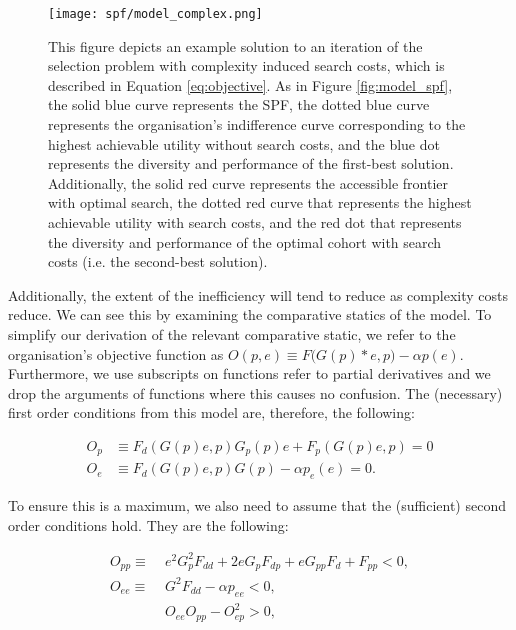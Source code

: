 \begin{figure}[!htb]
    \centering
    \caption{This figure depicts an example solution to an iteration of the selection problem with complexity induced search costs, which is described in Equation \ref{eq:objective}. As in Figure \ref{fig:model_spf}, the solid blue curve represents the SPF, the dotted blue curve represents the organisation's indifference curve corresponding to the highest achievable utility without search costs, and the blue dot represents the diversity and performance of the first-best solution. Additionally, the solid red curve represents the accessible frontier with optimal search, the dotted red curve that represents the highest achievable utility with search costs, and the red dot that represents the diversity and performance of the optimal cohort with search costs (i.e. the second-best solution).}
    \label{fig:model_complex}
    \texttt{[image: spf/model\_complex.png]} 
\end{figure}

Additionally, the extent of the inefficiency will tend to reduce as complexity costs reduce. We can see this by examining the comparative statics of the model. To simplify our derivation of the relevant comparative static, we refer to the organisation's objective function as $O(p,e)\equiv F\Big(G(p)*e ,p\Big) - \alpha p(e)$. Furthermore, we use subscripts on functions refer to partial derivatives and we drop the arguments of functions where this causes no confusion. The (necessary) first order conditions from this model are, therefore, the following:

\begin{align}
O_p & \equiv F_{d}(G(p)e,p)G_p(p)e + F_p(G(p)e,p) = 0 \nonumber \\
O_e & \equiv F_{d}(G(p)e,p)G(p) - \alpha p_e(e) = 0. \nonumber
\end{align}

To ensure this is a maximum, we also need to assume that the (sufficient) second order conditions hold. They are the following:

\begin{align}
O_{pp} \equiv &\;  e^2G_p^2F_{dd} + 2eG_pF_{dp} + eG_{pp}F_d + F_{pp} < 0, \nonumber \\
O_{ee}  \equiv &\;  G^2F_{dd} - \alpha p_{ee} < 0, \nonumber \\
&  \; O_{ee}O_{pp} - O_{ep}^2 > 0, \nonumber
\end{align}

